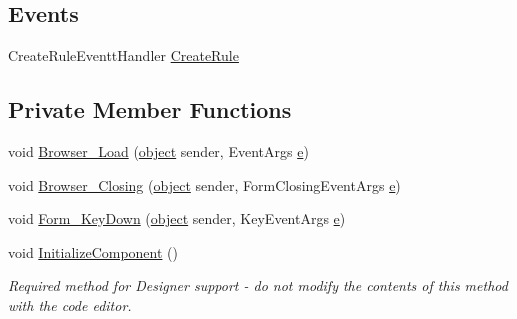 \subsection*{Events}
\begin{DoxyCompactItemize}
\item 
Create\+Rule\+Eventt\+Handler \hyperlink{class_web_analyzer_1_1_u_i_1_1_edit_rule_form_a270cf87236a05ce56741d8df75a16a0c}{Create\+Rule}
\end{DoxyCompactItemize}
\subsection*{Private Member Functions}
\begin{DoxyCompactItemize}
\item 
void \hyperlink{class_web_analyzer_1_1_u_i_1_1_edit_rule_form_a095a5a7e340a8e6f743e286f43edd488}{Browser\+\_\+\+Load} (\hyperlink{_u_i_2_h_t_m_l_resources_2js_2lib_2underscore_8min_8js_aae18b7515bb2bc4137586506e7c0c903}{object} sender, Event\+Args \hyperlink{_u_i_2_h_t_m_l_resources_2js_2lib_2bootstrap_8min_8js_ab5902775854a8b8440bcd25e0fe1c120}{e})
\item 
void \hyperlink{class_web_analyzer_1_1_u_i_1_1_edit_rule_form_ab13a2417f3c0ddaa74027b8597cd8225}{Browser\+\_\+\+Closing} (\hyperlink{_u_i_2_h_t_m_l_resources_2js_2lib_2underscore_8min_8js_aae18b7515bb2bc4137586506e7c0c903}{object} sender, Form\+Closing\+Event\+Args \hyperlink{_u_i_2_h_t_m_l_resources_2js_2lib_2bootstrap_8min_8js_ab5902775854a8b8440bcd25e0fe1c120}{e})
\item 
void \hyperlink{class_web_analyzer_1_1_u_i_1_1_edit_rule_form_a17969a02d4de3eaf67143a99e9bf55c8}{Form\+\_\+\+Key\+Down} (\hyperlink{_u_i_2_h_t_m_l_resources_2js_2lib_2underscore_8min_8js_aae18b7515bb2bc4137586506e7c0c903}{object} sender, Key\+Event\+Args \hyperlink{_u_i_2_h_t_m_l_resources_2js_2lib_2bootstrap_8min_8js_ab5902775854a8b8440bcd25e0fe1c120}{e})
\item 
void \hyperlink{class_web_analyzer_1_1_u_i_1_1_edit_rule_form_a53385d178cdcd4fb8b813d7da0ae31d5}{Initialize\+Component} ()
\begin{DoxyCompactList}\small\item\em Required method for Designer support -\/ do not modify the contents of this method with the code editor. \end{DoxyCompactList}\end{DoxyCompactItemize}
